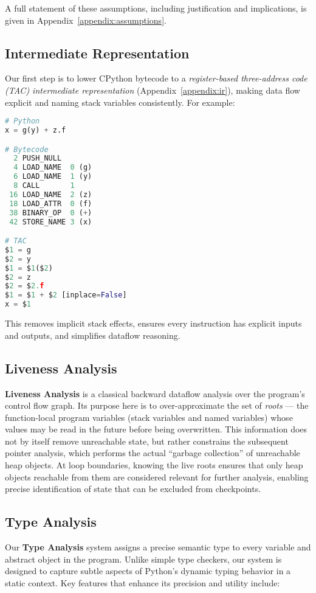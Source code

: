 A full statement of these assumptions, including justification and implications, is given in Appendix~\ref{appendix:assumptions}.

\subsection{Intermediate Representation}
Our first step is to lower CPython bytecode to a \emph{register-based three-address code (TAC) intermediate representation} (Appendix~\ref{appendix:ir}), making data flow explicit and naming stack variables consistently. For example:
\begin{lstlisting}[language=Python]
# Python
x = g(y) + z.f

# Bytecode
  2 PUSH_NULL
  4 LOAD_NAME  0 (g)
  6 LOAD_NAME  1 (y)
  8 CALL       1
 16 LOAD_NAME  2 (z)
 18 LOAD_ATTR  0 (f)
 38 BINARY_OP  0 (+)
 42 STORE_NAME 3 (x)

# TAC
$1 = g
$2 = y
$1 = $1($2)
$2 = z
$2 = $2.f
$1 = $1 + $2 [inplace=False] 
x = $1
\end{lstlisting}
This removes implicit stack effects, ensures every instruction has explicit inputs and outputs, and simplifies dataflow reasoning.

\subsection{Liveness Analysis}

\textbf{Liveness Analysis} is a classical backward dataflow analysis over the program’s control flow graph. Its purpose here is to over-approximate the set of \emph{roots} --- the function-local program variables (stack variables and named variables) whose values may be read in the future before being overwritten. This information does not by itself remove unreachable state, but rather constrains the subsequent pointer analysis, which performs the actual ``garbage collection'' of unreachable heap objects. At loop boundaries, knowing the live roots ensures that only heap objects reachable from them are considered relevant for further analysis, enabling precise identification of state that can be excluded from checkpoints.

\subsection{Type Analysis}
\label{sec:typesystem}

Our \textbf{Type Analysis} system assigns a precise semantic type to every variable and abstract object in the program. Unlike simple type checkers, our system is designed to capture subtle aspects of Python's dynamic typing behavior in a static context. Key features that enhance its precision and utility include:

